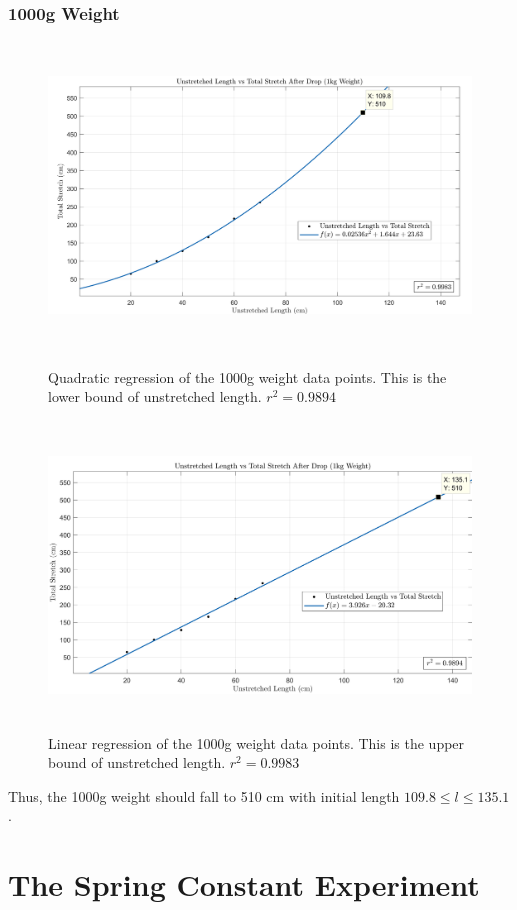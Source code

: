 \documentclass[12pt]{article}
\begin{document}
\subsubsection{1000g Weight}
\begin{figure}[h]
    \centering
    \includegraphics[height=8.15cm]{lengthVsStretch1kgQuad}
    \caption{Quadratic regression of the 1000g weight data points. This is the lower bound of unstretched length. $r^2=0.9894$}
    \label{fig:1000gQuadratic}
    \vspace*{\floatsep}
    \includegraphics[height=8.15cm]{lengthVsStretch1kglin}
    \caption{Linear regression of the 1000g weight data points. This is the upper bound of unstretched length. $r^2=0.9983$}
    \label{fig:1000gLinear}
\end{figure}
Thus, the 1000g weight should fall to 510 cm with initial length $109.8 \leq l \leq 135.1$.
\newpage

\section{The Spring Constant Experiment}
\end{document}
